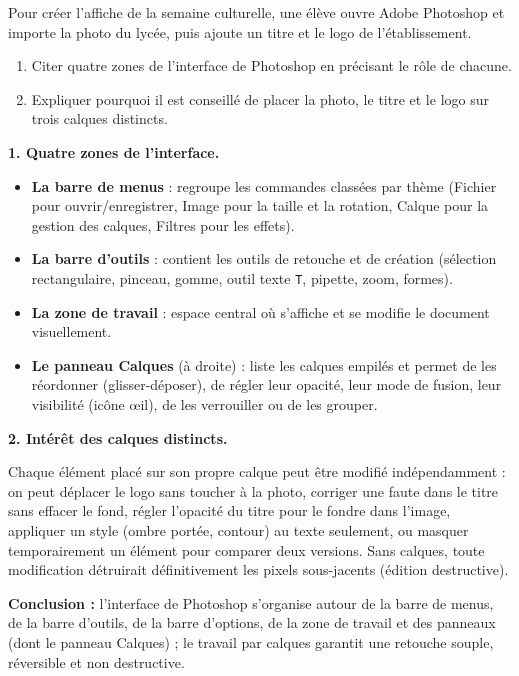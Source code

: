 \documentclass[11pt]{article}
\begin{document}
\begin{exoresolu}
Pour créer l'affiche de la semaine culturelle, une élève ouvre Adobe Photoshop et importe la photo du lycée, puis ajoute un titre et le logo de l'établissement.
\begin{enumerate}
  \item Citer quatre zones de l'interface de Photoshop en précisant le rôle de chacune.
  \item Expliquer pourquoi il est conseillé de placer la photo, le titre et le logo sur trois calques distincts.
\end{enumerate}
\tcblower
\textbf{1. Quatre zones de l'interface.}

\begin{itemize}
  \item \textbf{La barre de menus} : regroupe les commandes classées par thème (Fichier pour ouvrir/enregistrer, Image pour la taille et la rotation, Calque pour la gestion des calques, Filtres pour les effets).
  \item \textbf{La barre d'outils} : contient les outils de retouche et de création (sélection rectangulaire, pinceau, gomme, outil texte \texttt{T}, pipette, zoom, formes).
  \item \textbf{La zone de travail} : espace central où s'affiche et se modifie le document visuellement.
  \item \textbf{Le panneau Calques} (à droite) : liste les calques empilés et permet de les réordonner (glisser-déposer), de régler leur opacité, leur mode de fusion, leur visibilité (icône œil), de les verrouiller ou de les grouper.
\end{itemize}

\textbf{2. Intérêt des calques distincts.}

Chaque élément placé sur son propre calque peut être modifié indépendamment : on peut déplacer le logo sans toucher à la photo, corriger une faute dans le titre sans effacer le fond, régler l'opacité du titre pour le fondre dans l'image, appliquer un style (ombre portée, contour) au texte seulement, ou masquer temporairement un élément pour comparer deux versions. Sans calques, toute modification détruirait définitivement les pixels sous-jacents (édition destructive).

\textbf{Conclusion :} l'interface de Photoshop s'organise autour de la barre de menus, de la barre d'outils, de la barre d'options, de la zone de travail et des panneaux (dont le panneau Calques) ; le travail par calques garantit une retouche souple, réversible et non destructive.
\end{exoresolu}
\end{document}
